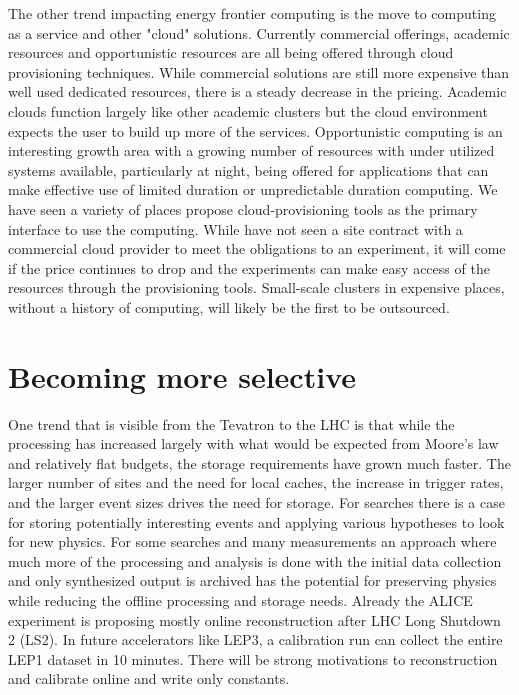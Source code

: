The other trend impacting energy frontier computing is the move to computing as a service and other "cloud" solutions.    Currently commercial offerings, academic resources and opportunistic resources are all being offered through cloud provisioning techniques.    While commercial solutions are still more expensive than well used dedicated resources, there is a steady decrease in the pricing.   Academic clouds function largely like other academic clusters but the cloud environment expects the user to build up more of the services.   Opportunistic computing is an interesting growth area with a growing number of resources with under utilized systems available, particularly at night, being offered for applications that can make effective use of limited duration or unpredictable duration computing.    We have seen a variety of places propose cloud-provisioning tools as the primary interface to use the computing. While have not seen a site contract with a commercial cloud provider to meet the obligations to an experiment, it will come if the price continues to drop and the experiments can make easy access of the resources through the provisioning tools.   Small-scale clusters in expensive places, without a history of computing, will likely be the first to be outsourced.   

\section{Becoming more selective}
\label{sec:comp-select}

One trend that is visible from the Tevatron to the LHC is that while the processing has increased largely with what would be expected from Moore's law and relatively flat budgets, the storage requirements have grown much faster.   The larger number of sites and the need for local caches, the increase in trigger rates, and the larger event sizes drives the need for storage.   For searches there is a case for storing potentially interesting events and applying various hypotheses to look for new physics.   For some searches and many measurements an approach where much more of the processing and analysis is done with the initial data collection and only synthesized output is archived has the potential for preserving physics while reducing the offline processing and storage needs.   Already the ALICE experiment is proposing mostly online reconstruction after LHC Long Shutdown 2 (LS2).   In future accelerators like LEP3, a calibration run can collect the entire LEP1 dataset in 10 minutes.   There will be strong motivations to reconstruction and calibrate online and write only constants.  

